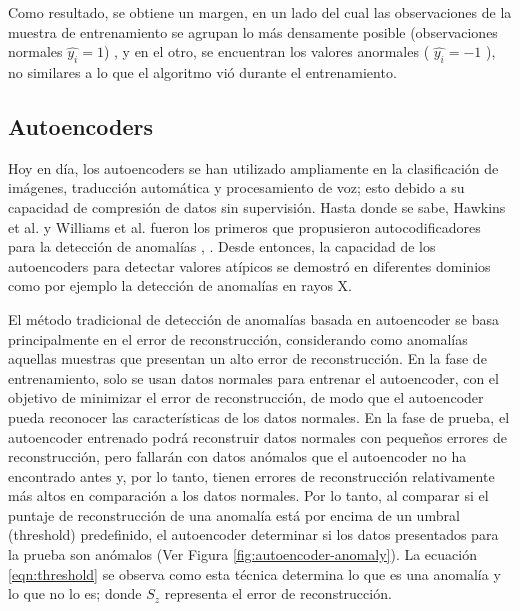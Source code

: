 Como resultado, se obtiene un margen, en un lado del cual las observaciones de la muestra de entrenamiento se agrupan lo más densamente posible (observaciones normales $\hat{y_{i}} = 1$) , y en el otro, se encuentran los valores anormales ( $\hat{y_{i}} = -1$ ), no similares a lo que el algoritmo vi\'{o} durante el entrenamiento.

\subsection{Autoencoders}

Hoy en día, los autoencoders se han utilizado ampliamente en la clasificación de imágenes, traducción automática y procesamiento de voz; esto debido a su capacidad de compresión de datos sin supervisión. Hasta donde se sabe, Hawkins et al. y Williams et al. fueron los primeros que propusieron autocodificadores para la detección de anomalías \cite{57}, \cite{58}. Desde entonces, la capacidad de los autoencoders para detectar valores at\'{i}picos se demostró en diferentes dominios como por ejemplo la detecci\'{o}n de anomal\'{i}as en rayos X.

\vspace{5mm} %

El m\'{e}todo tradicional de detecci\'{o}n de anomal\'{i}as basada en autoencoder se basa principalmente en el error de reconstrucci\'{o}n, considerando como anomal\'{i}as aquellas muestras que presentan un alto error de reconstrucci\'{o}n. En la fase de entrenamiento, solo se usan datos normales para entrenar el autoencoder, con el objetivo de minimizar el error de reconstrucci\'{o}n, de modo que el autoencoder pueda reconocer las caracter\'{i}sticas de los datos normales. En la fase de prueba, el autoencoder entrenado podr\'{a} reconstruir datos normales con peque\~{n}os errores de reconstrucci\'{o}n, pero fallar\'{a}n con datos an\'{o}malos que el autoencoder no ha encontrado antes y, por lo tanto, tienen errores de reconstrucci\'{o}n relativamente m\'{a}s altos en comparaci\'{o}n a los datos normales. Por lo tanto, al comparar si el puntaje de reconstrucci\'{o}n de una anomal\'{i}a est\'{a} por encima de un umbral (threshold) predefinido, el autoencoder determinar si los datos presentados para la prueba son an\'{o}malos \cite{47} (Ver Figura \ref{fig:autoencoder-anomaly}). La ecuaci\'{o}n \ref{eqn:threshold} se observa como esta t\'{e}cnica determina lo que es una anomal\'{i}a y lo que no lo es; donde $S_{z}$ representa el error de reconstrucci\'{o}n.

